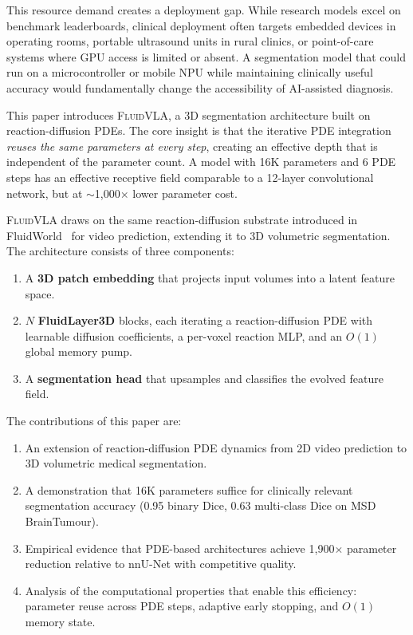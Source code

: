 \documentclass{article}
\newcommand{\fluidvla}{\textsc{FluidVLA}}
\begin{document}
This resource demand creates a deployment gap. While research models excel on benchmark leaderboards, clinical deployment often targets embedded devices in operating rooms, portable ultrasound units in rural clinics, or point-of-care systems where GPU access is limited or absent. A segmentation model that could run on a microcontroller or mobile NPU while maintaining clinically useful accuracy would fundamentally change the accessibility of AI-assisted diagnosis.

This paper introduces \fluidvla{}, a 3D segmentation architecture built on reaction-diffusion PDEs. The core insight is that the iterative PDE integration \emph{reuses the same parameters at every step}, creating an effective depth that is independent of the parameter count. A model with 16K parameters and 6 PDE steps has an effective receptive field comparable to a 12-layer convolutional network, but at $\sim$1,000$\times$ lower parameter cost.

\fluidvla{} draws on the same reaction-diffusion substrate introduced in FluidWorld~\cite{polly2026fluidworld} for video prediction, extending it to 3D volumetric segmentation. The architecture consists of three components:
\begin{enumerate}
    \item A \textbf{3D patch embedding} that projects input volumes into a latent feature space.
    \item $N$ \textbf{FluidLayer3D} blocks, each iterating a reaction-diffusion PDE with learnable diffusion coefficients, a per-voxel reaction MLP, and an $O(1)$ global memory pump.
    \item A \textbf{segmentation head} that upsamples and classifies the evolved feature field.
\end{enumerate}

The contributions of this paper are:
\begin{enumerate}
    \item An extension of reaction-diffusion PDE dynamics from 2D video prediction to 3D volumetric medical segmentation.
    \item A demonstration that 16K parameters suffice for clinically relevant segmentation accuracy (0.95 binary Dice, 0.63 multi-class Dice on MSD BrainTumour).
    \item Empirical evidence that PDE-based architectures achieve 1,900$\times$ parameter reduction relative to nnU-Net with competitive quality.
    \item Analysis of the computational properties that enable this efficiency: parameter reuse across PDE steps, adaptive early stopping, and $O(1)$ memory state.
\end{enumerate}
\end{document}
